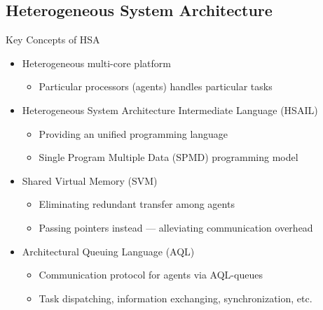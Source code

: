 \documentclass{beamer}
\begin{document}
\begin{CJK}{UTF8}{bkai}
            \subsection{Heterogeneous System Architecture}
            \begin{frame}{Key Concepts of HSA}
                \begin{itemize}
                    \item <2->{Heterogeneous multi-core platform
                            \begin{itemize}
                                \item Particular processors (agents) handles particular tasks%
                            \end{itemize}
                        }
                    \item <3->{Heterogeneous System Architecture Intermediate Language (HSAIL)
                            \begin{itemize}
                                \item Providing an unified programming language %
                                \item Single Program Multiple Data (SPMD) programming model
                            \end{itemize}
                        }
                    \item <4->{Shared Virtual Memory (SVM)
                            \begin{itemize}
                                \item Eliminating redundant transfer among agents
                                \item Passing pointers instead --- alleviating communication overhead
                            \end{itemize}
                        }
                    \item <5->{Architectural Queuing Language (AQL)
                            \begin{itemize}
                                \item Communication protocol for agents via AQL-queues
                                \item Task dispatching, information exchanging, synchronization, etc.
                            \end{itemize}
                        }
                \end{itemize} 
            \end{frame}


\end{CJK}
\end{document}

